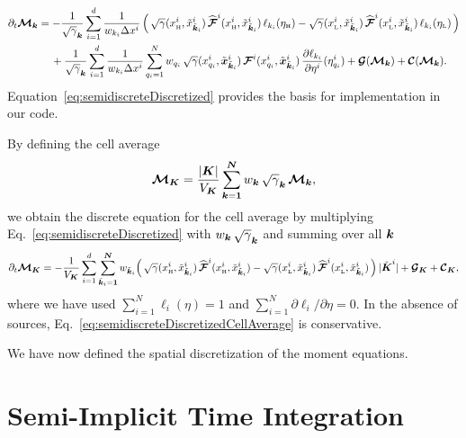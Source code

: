 \documentclass[10pt,preprint]{aastex}
\begin{document}
\begin{align}
  \partial_{t}{\boldsymbol{\mathcal{M}}_{\boldsymbol{k}}}
  &=
  -\frac{1}{\sqrt{\gamma}_{\boldsymbol{k}}}\sum_{i=1}^{d} 
  \frac{1}{w_{k_{i}}\Delta x^{i}}\,
  \Big(\,
    \sqrt{\gamma}(x_{\mbox{\tiny H}}^{i},\tilde{x}_{\tilde{\boldsymbol{k}}_{i}}^{i})\,\widehat{\boldsymbol{\mathcal{F}}}^{i}(x_{\mbox{\tiny H}}^{i},\tilde{x}_{\tilde{\boldsymbol{k}}_{i}}^{i})\,\ell_{k_{i}}(\eta_{\mbox{\tiny H}})
    -\sqrt{\gamma}(x_{\mbox{\tiny L}}^{i},\tilde{x}_{\tilde{\boldsymbol{k}}_{i}}^{i})\,\widehat{\boldsymbol{\mathcal{F}}}^{i}(x_{\mbox{\tiny L}}^{i},\tilde{x}_{\tilde{\boldsymbol{k}}_{i}}^{i})\,\ell_{k_{i}}(\eta_{\mbox{\tiny L}})
  \,\Big)
  \nonumber \\
  &\hspace{12pt}
  +\frac{1}{\sqrt{\gamma}_{\boldsymbol{k}}}\sum_{i=1}^{d}\frac{1}{w_{k_{i}}\Delta x^{i}}
  \sum_{q_{i}=1}^{N}w_{q_{i}}\,\sqrt{\gamma}(x_{q_{i}}^{i},\tilde{\boldsymbol{x}}_{\tilde{\boldsymbol{k}}_{i}}^{i})\,
  \boldsymbol{\mathcal{F}}^{i}(x_{q_{i}}^{i},\tilde{\boldsymbol{x}}_{\tilde{\boldsymbol{k}}_{i}}^{i})\,\frac{\partial \ell_{k_{i}}}{\partial \eta^{i}}(\eta_{q_{i}}^{i})
  +\boldsymbol{\mathcal{G}}(\boldsymbol{\mathcal{M}}_{\boldsymbol{k}})+\boldsymbol{\mathcal{C}}(\boldsymbol{\mathcal{M}}_{\boldsymbol{k}}).
  \label{eq:semidiscreteDiscretized}
\end{align}
Equation~\eqref{eq:semidiscreteDiscretized} provides the basis for implementation in our code.  

By defining the cell average
\begin{equation}
  \boldsymbol{\mathcal{M}}_{\boldsymbol{K}}=\frac{|\boldsymbol{K}|}{V_{\boldsymbol{K}}}\sum_{\boldsymbol{k}=\boldsymbol{1}}^{\boldsymbol{N}}w_{\boldsymbol{k}}\,\sqrt{\gamma}_{\boldsymbol{k}}\,\boldsymbol{\mathcal{M}}_{\boldsymbol{k}},
\end{equation}
we obtain the discrete equation for the cell average by multiplying Eq.~\eqref{eq:semidiscreteDiscretized} with $w_{\boldsymbol{k}}\,\sqrt{\gamma}_{\boldsymbol{k}}$ and summing over all $\boldsymbol{k}$
\begin{equation}
  \partial_{t}{\boldsymbol{\mathcal{M}}_{\boldsymbol{K}}}
  =-\frac{1}{V_{\boldsymbol{K}}}\sum_{i=1}^{d}\sum_{\tilde{\boldsymbol{k}}_{i}=\boldsymbol{1}}^{\boldsymbol{N}}w_{\tilde{\boldsymbol{k}}_{i}}
  \Big(\,
    \sqrt{\gamma}(x_{\mbox{\tiny H}}^{i},\tilde{x}_{\tilde{\boldsymbol{k}}_{i}}^{i})\,\widehat{\boldsymbol{\mathcal{F}}}^{i}(x_{\mbox{\tiny H}}^{i},\tilde{x}_{\tilde{\boldsymbol{k}}_{i}}^{i})
    -\sqrt{\gamma}(x_{\mbox{\tiny L}}^{i},\tilde{x}_{\tilde{\boldsymbol{k}}_{i}}^{i})\,\widehat{\boldsymbol{\mathcal{F}}}^{i}(x_{\mbox{\tiny L}}^{i},\tilde{x}_{\tilde{\boldsymbol{k}}_{i}}^{i})
  \,\Big)\,|\tilde{\boldsymbol{K}}^{i}|
  +\boldsymbol{\mathcal{G}}_{\boldsymbol{K}}+\boldsymbol{\mathcal{C}}_{\boldsymbol{K}},
  \label{eq:semidiscreteDiscretizedCellAverage}
\end{equation}
where we have used $\sum_{i=1}^{N}\ell_{i}(\eta)=1$ and $\sum_{i=1}^{N}\partial\ell_{i}/\partial\eta=0$.  
In the absence of sources, Eq.~\eqref{eq:semidiscreteDiscretizedCellAverage} is conservative.  

We have now defined the spatial discretization of the moment equations.  

\clearpage

\section{Semi-Implicit Time Integration}
\end{document}
